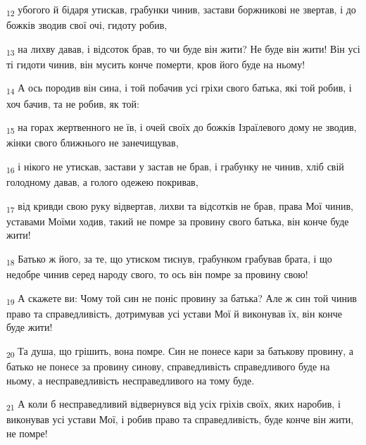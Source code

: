 \begin{tcolorbox}
\textsubscript{12} убогого й бідаря утискав, грабунки чинив, застави боржникові не звертав, і до божків зводив свої очі, гидоту робив,
\end{tcolorbox}
\begin{tcolorbox}
\textsubscript{13} на лихву давав, і відсоток брав, то чи буде він жити? Не буде він жити! Він усі ті гидоти чинив, він мусить конче померти, кров його буде на ньому!
\end{tcolorbox}
\begin{tcolorbox}
\textsubscript{14} А ось породив він сина, і той побачив усі гріхи свого батька, які той робив, і хоч бачив, та не робив, як той:
\end{tcolorbox}
\begin{tcolorbox}
\textsubscript{15} на горах жертвенного не їв, і очей своїх до божків Ізраїлевого дому не зводив, жінки свого ближнього не занечищував,
\end{tcolorbox}
\begin{tcolorbox}
\textsubscript{16} і нікого не утискав, застави у застав не брав, і грабунку не чинив, хліб свій голодному давав, а голого одежею покривав,
\end{tcolorbox}
\begin{tcolorbox}
\textsubscript{17} від кривди свою руку відвертав, лихви та відсотків не брав, права Мої чинив, уставами Моїми ходив, такий не помре за провину свого батька, він конче буде жити!
\end{tcolorbox}
\begin{tcolorbox}
\textsubscript{18} Батько ж його, за те, що утиском тиснув, грабунком грабував брата, і що недобре чинив серед народу свого, то ось він помре за провину свою!
\end{tcolorbox}
\begin{tcolorbox}
\textsubscript{19} А скажете ви: Чому той син не поніс провину за батька? Але ж син той чинив право та справедливість, дотримував усі устави Мої й виконував їх, він конче буде жити!
\end{tcolorbox}
\begin{tcolorbox}
\textsubscript{20} Та душа, що грішить, вона помре. Син не понесе кари за батькову провину, а батько не понесе за провину синову, справедливість справедливого буде на ньому, а несправедливість несправедливого на тому буде.
\end{tcolorbox}
\begin{tcolorbox}
\textsubscript{21} А коли б несправедливий відвернувся від усіх гріхів своїх, яких наробив, і виконував усі устави Мої, і робив право та справедливість, буде конче він жити, не помре!
\end{tcolorbox}
